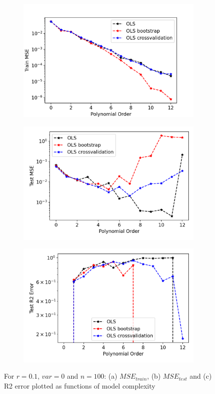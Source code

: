\begin{figure}
\centering
\begin{subfigure}{.5\textwidth}
  \centering
  \includegraphics[width=.9\linewidth]{Images/ols15.png}
  \caption{}
  \label{fig:ols15}
\end{subfigure}%
\begin{subfigure}{.5\textwidth}
  \centering
  \includegraphics[width=.9\linewidth]{Images/ols14.png}
  \caption{}
  \label{fig:ols14}
\end{subfigure}
\begin{subfigure}{.5\textwidth}
  \centering
  \includegraphics[width=.9\linewidth]{Images/ols16.png}
  \caption{}
  \label{fig:ols16}
\end{subfigure}
\caption{For $r=0.1$, $var=0$ and $n=100$: (a) $MSE_{train}$, (b) $MSE_{test}$ and (c) R2 error plotted as functions of model complexity}
\label{fig:OLS_resample2}
\end{figure}

